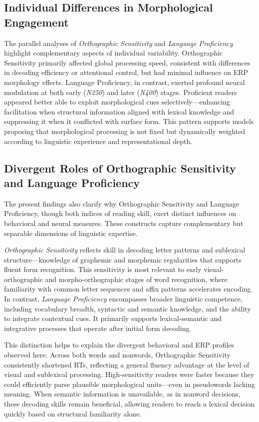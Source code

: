 \documentclass[preprint,12pt, authoryear, review]{elsarticle}
\begin{document}
\subsection{Individual Differences in Morphological Engagement}

The parallel analyses of \textit{Orthographic Sensitivity} and \textit{Language Proficiency} highlight complementary aspects of individual variability. Orthographic Sensitivity primarily affected global processing speed, consistent with differences in decoding efficiency or attentional control, but had minimal influence on ERP morphology effects. Language Proficiency, in contrast, exerted profound neural modulation at both early (\textit{N250}) and later (\textit{N400}) stages. Proficient readers appeared better able to exploit morphological cues selectively—enhancing facilitation when structural information aligned with lexical knowledge and suppressing it when it conflicted with surface form. This pattern supports models proposing that morphological processing is not fixed but dynamically weighted according to linguistic experience and representational depth.

\subsection{Divergent Roles of Orthographic Sensitivity and Language Proficiency}

The present findings also clarify why Orthographic Sensitivity and Language Proficiency, though both indices of reading skill, exert distinct influences on behavioral and neural measures. These constructs capture complementary but separable dimensions of linguistic expertise. 

\textit{Orthographic Sensitivity} reflects skill in decoding letter patterns and sublexical structure—knowledge of graphemic and morphemic regularities that supports fluent form recognition. This sensitivity is most relevant to early visual-orthographic and morpho-orthographic stages of word recognition, where familiarity with common letter sequences and affix patterns accelerates encoding. In contrast, \textit{Language Proficiency} encompasses broader linguistic competence, including vocabulary breadth, syntactic and semantic knowledge, and the ability to integrate contextual cues. It primarily supports lexical-semantic and integrative processes that operate after initial form decoding.

This distinction helps to explain the divergent behavioral and ERP profiles observed here. Across both words and nonwords, Orthographic Sensitivity consistently shortened RTs, reflecting a general fluency advantage at the level of visual and sublexical processing. High-sensitivity readers were faster because they could efficiently parse plausible morphological units—even in pseudowords lacking meaning. When semantic information is unavailable, as in nonword decisions, these decoding skills remain beneficial, allowing readers to reach a lexical decision quickly based on structural familiarity alone.
\end{document}
